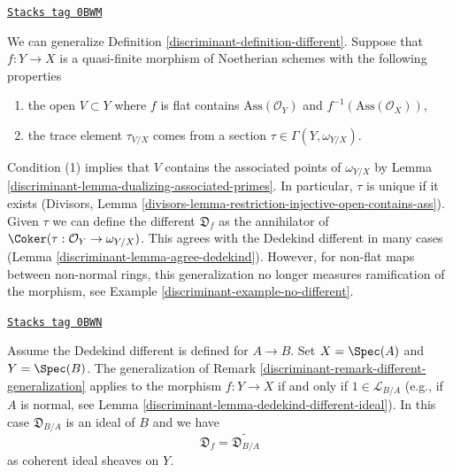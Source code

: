 \begin{remark}
\label{discriminant-remark-different-generalization}
\href{https://stacks.math.columbia.edu/tag/0BWM}{\texttt{Stacks tag 0BWM}}

We can generalize Definition \ref{discriminant-definition-different}.
Suppose that $f : Y \to X$ is a quasi-finite morphism of Noetherian schemes
with the following properties
\begin{enumerate}
\item the open $V \subset Y$ where $f$ is flat contains
$\text{Ass}(\mathcal{O}_Y)$ and $f^{-1}(\text{Ass}(\mathcal{O}_X))$,
\item the trace element $\tau_{V/X}$ comes from a section
$\tau \in \Gamma(Y, \omega_{Y/X})$.
\end{enumerate}
Condition (1) implies that $V$ contains the associated points of
$\omega_{Y/X}$ by Lemma \ref{discriminant-lemma-dualizing-associated-primes}.
In particular, $\tau$ is unique if it exists
(Divisors, Lemma \ref{divisors-lemma-restriction-injective-open-contains-ass}).
Given $\tau$ we can define the different $\mathfrak{D}_f$ as the annihilator of
$\Coker(\tau : \mathcal{O}_Y \to \omega_{Y/X})$. This agrees with the
Dedekind different in many cases (Lemma \ref{discriminant-lemma-agree-dedekind}).
However, for non-flat maps between non-normal rings, this generalization
no longer measures ramification of the morphism, see
Example \ref{discriminant-example-no-different}.
\end{remark}

\begin{lemma}
\label{discriminant-lemma-agree-dedekind}
\href{https://stacks.math.columbia.edu/tag/0BWN}{\texttt{Stacks tag 0BWN}}

Assume the Dedekind different is defined for $A \to B$.
Set $X = \Spec(A)$ and $Y = \Spec(B)$. The generalization of
Remark \ref{discriminant-remark-different-generalization}
applies to the morphism $f : Y \to X$ if and only if
$1 \in \mathcal{L}_{B/A}$ (e.g., if $A$ is normal, see
Lemma \ref{discriminant-lemma-dedekind-different-ideal}).
In this case $\mathfrak{D}_{B/A}$ is an ideal of $B$ and we have
$$
\mathfrak{D}_f = \widetilde{\mathfrak{D}_{B/A}}
$$
as coherent ideal sheaves on $Y$.
\end{lemma}

